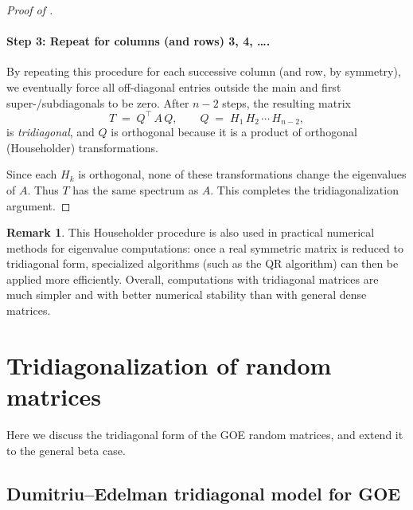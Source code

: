 \documentclass[letterpaper,11pt,oneside,reqno]{article}
\numberwithin{equation}{section}
\theoremstyle{definition}
\newtheorem{remark}[proposition]{Remark}
\begin{document}
\begin{proof}[Proof of ]
\paragraph{Step 3: Repeat for columns (and rows) 3, 4, \dots.}
By repeating this procedure for each successive column (and row, by symmetry), we eventually force all off-diagonal entries outside the main and first super-/subdiagonals to be zero.  After $n-2$ steps, the resulting matrix
\[
  T
  \;=\;
  Q^\top\,A\,Q,
  \qquad
  Q \;=\; H_1\,H_2\,\cdots\,H_{n-2},
\]
is \emph{tridiagonal}, and $Q$ is orthogonal because it is a product of orthogonal (Householder) transformations.

Since each $H_k$ is orthogonal, none of these transformations change the eigenvalues of $A$.  Thus $T$ has the same spectrum as $A$.  This completes the tridiagonalization argument.
\end{proof}




\begin{remark}
This Householder procedure is also used in practical numerical methods for eigenvalue computations: once a real symmetric matrix is reduced to tridiagonal form, specialized algorithms (such as the QR algorithm) can then be applied more efficiently.
Overall, computations with tridiagonal matrices are much simpler and with better numerical stability than with general dense matrices.
\end{remark}


\section{Tridiagonalization of random matrices}
\label{sec:Wigner-SC-detailed}

Here we discuss the tridiagonal form of the GOE random matrices,
and extend it to the general beta case.

\subsection{Dumitriu–Edelman tridiagonal model for GOE}
\end{document}
